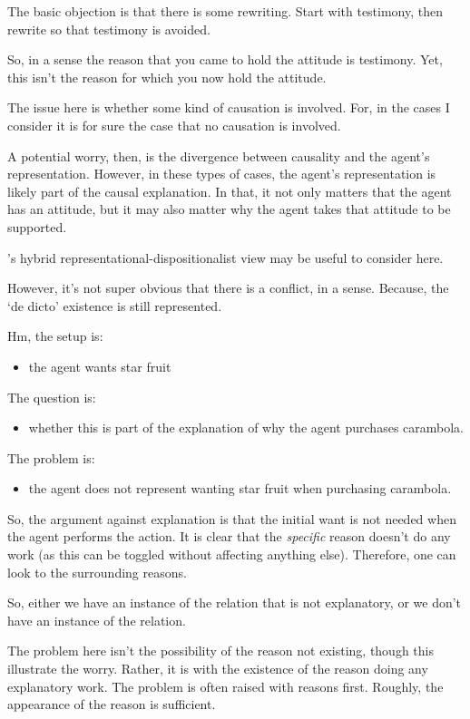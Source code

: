 \documentclass[10pt]{article}
\begin{document}
The basic objection is that there is some rewriting.
Start with testimony, then rewrite so that testimony is avoided.

So, in a sense the reason that you came to hold the attitude is testimony.
Yet, this isn't the reason for which you now hold the attitude.

The issue here is whether some kind of causation is involved.
For, in the cases I consider it is for sure the case that no causation is involved.

A potential worry, then, is the divergence between causality and the agent's representation.
However, in these types of cases, the agent's representation is likely part of the causal explanation.
In that, it not only matters that the agent has an attitude, but it may also matter why the agent takes that attitude to be supported.

\citeauthor{Neta:2019aa}'s hybrid representational-dispositionalist view may be useful to consider here.

However, it's not super obvious that there is a conflict, in a sense.
Because, the `de dicto' existence is still represented.

Hm, the setup is:
\begin{itemize}
\item the agent wants star fruit
\end{itemize}
The question is:
\begin{itemize}
\item whether this is part of the explanation of why the agent purchases carambola.
\end{itemize}
The problem is:
\begin{itemize}
\item the agent does not represent wanting star fruit when purchasing carambola.
\end{itemize}

So, the argument against explanation is that the initial want is not needed when the agent performs the action.
It is clear that the \emph{specific} reason doesn't do any work (as this can be toggled without affecting anything else).
Therefore, one can look to the surrounding reasons.

So, either we have an instance of the relation that is not explanatory, or we don't have an instance of the relation.

{\color{red}
  The problem here isn't the possibility of the reason not existing, though this illustrate the worry.
  Rather, it is with the existence of the reason doing any explanatory work.
}
The problem is often raised with reasons first.
Roughly, the appearance of the reason is sufficient.
\end{document}
